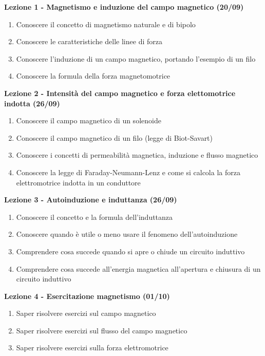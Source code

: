 \documentclass{article}
\begin{document}
	\begin{center}
		\textbf{Lezione 1 - Magnetismo e induzione del campo magnetico (20/09)}

	\begin{enumerate}
		\item Conoscere il concetto di magnetismo naturale e di bipolo
		\item Conoscere le caratteristiche delle linee di forza
		\item Conoscere l'induzione di un campo magnetico, portando l'esempio di un filo
		\item Conoscere la formula della forza magnetomotrice
	\end{enumerate}


		\textbf{Lezione 2 - Intensità del campo magnetico e forza elettomotrice indotta (26/09)}
		\begin{enumerate}
			\item Conoscere il campo magnetico di un solenoide
			\item Conoscere il campo magnetico di un filo (legge di Biot-Savart)
			\item Conoscere i concetti di permeabilità magnetica, induzione e flusso magnetico
			\item Conoscere la legge di Faraday-Neumann-Lenz e come si calcola la forza elettromotrice indotta in un conduttore
		\end{enumerate}

		\textbf{Lezione 3 - Autoinduzione e induttanza (26/09)}
		\begin{enumerate}
			\item Conoscere il concetto e la formula dell'induttanza
			\item Conoscere quando è utile o meno usare il fenomeno dell'autoinduzione
			\item Comprendere cosa succede quando si apre o chiude un circuito induttivo
			\item Comprendere cosa succede all'energia magnetica all'apertura e chiusura di un circuito induttivo
		\end{enumerate}

		\textbf{Lezione 4 - Esercitazione magnetismo (01/10)}
		\begin{enumerate}
			\item Saper risolvere esercizi sul campo magnetico
			\item Saper risolvere esercizi sul flusso del campo magnetico
			\item Saper risolvere esercizi sulla forza elettromotrice
		\end{enumerate}


\end{center}
\end{document}
